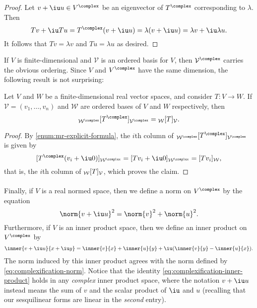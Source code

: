 \documentclass[a4paper, 11pt]{memoir}
\numberwithin{equation}{chapter}
\newcommand{\calV}{\mathcal{V}}
\newcommand{\calW}{\mathcal{W}}
\newcommand{\newpar}{\paragraph{}}
\begin{document}
\begin{proof}
    Let $v + \iu u \in V^\complex$ be an eigenvector of $T^\complex$ corresponding to $\lambda$. Then
    \begin{equation*}
        Tv + \iu Tu
            = T^\complex (v + \iu u)
            = \lambda(v + \iu u)
            = \lambda v + \iu \lambda u.
    \end{equation*}
    It follows that $Tv = \lambda v$ and $Tu = \lambda u$ as desired.
\end{proof}


If $V$ is finite-dimensional and $\calV$ is an ordered basis for $V$, then $\calV^\complex$ carries the obvious ordering. Since $V$ and $V^\complex$ have the same dimension, the following result is not surprising:

\begin{proposition}
    Let $V$ and $W$ be a finite-dimensional real vector spaces, and consider $T \colon V \to W$. If $\calV = (v_1, \ldots, v_n)$ and $\calW$ are ordered bases of $V$ and $W$ respectively, then
    \begin{equation*}
        \mr{\calW^\complex}{T^\complex}{\calV^\complex}
            = \mr{\calW}{T}{\calV}.
    \end{equation*}
\end{proposition}

\begin{proof}
    By \cref{enum:mr-explicit-formula}, the $i$th column of $\mr{\calW^\complex}{T^\complex}{\calV^\complex}$ is given by
    \begin{equation*}
        \coordvec{T^\complex (v_i + \iu 0)}{\calW^\complex}
            = \coordvec{Tv_i + \iu 0}{\calW^\complex}
            = \coordvec{Tv_i}{\calW},
    \end{equation*}
    that is, the $i$th column of $\mr{\calW}{T}{\calV}$, which proves the claim.
\end{proof}


\newpar

Finally, if $V$ is a real normed space, then we define a norm on $V^\complex$ by the equation
%
\begin{equation}
    \label{eq:complexification-norm}
    \norm{v + \iu u}^2
        = \norm{v}^2 + \norm{u}^2.
\end{equation}
%
Furthermore, if $V$ is an inner product space, then we define an inner product on $V^\complex$ by
%
\begin{equation}
    \label{eq:complexification-inner-product}
    \inner{v + \iu u}{x + \iu y}
        = \inner{v}{x}
          + \inner{u}{y}
          + \iu (\inner{v}{y} - \inner{u}{x}).
\end{equation}
%
The norm induced by this inner product agrees with the norm defined by \cref{eq:complexification-norm}. Notice that the identity \cref{eq:complexification-inner-product} holds in any \emph{complex} inner product space, where the notation $v + \iu u$ instead means the sum of $v$ and the scalar product of $\iu$ and $u$ (recalling that our sesquilinear forms are linear in the \emph{second} entry).
\end{document}
